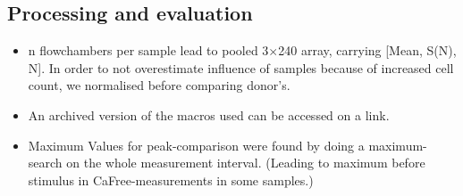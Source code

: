 


\subsection{Processing and evaluation}

\begin{itemize}
    \item n flowchambers per sample lead to pooled 3$\times$240 array, carrying [Mean, S(N), N]. In order to not overestimate influence of samples because of increased cell count, we normalised before comparing donor's.
    \item An archived version of the macros used can be accessed on a link.
    \item Maximum Values for peak-comparison were found by doing a maximum-search on the whole measurement interval. (Leading to maximum before stimulus in CaFree-measurements in some samples.)
\end{itemize}